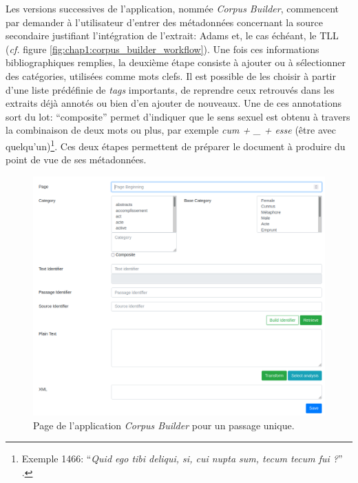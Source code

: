 Les versions successives de l'application, nommée \textit{Corpus Builder}, commencent par demander à l'utilisateur d'entrer des métadonnées concernant la source secondaire justifiant l'intégration de l'extrait: Adams et, le cas échéant, le TLL (\textit{cf.} figure \ref{fig:chap1:corpus_builder_workflow}). Une fois ces informations bibliographiques remplies, la deuxième étape consiste à ajouter ou à sélectionner des catégories, utilisées comme mots clefs. Il est possible de les choisir à partir d'une liste prédéfinie de \textit{tags} importants, de reprendre ceux retrouvés dans les extraits déjà annotés ou bien d'en ajouter de nouveaux. Une de ces annotations sort du lot: \enquote{composite} permet d'indiquer que le sens sexuel est obtenu à travers la combinaison de deux mots ou plus, par exemple \textit{cum + \_ + esse} (être avec quelqu'un)\footnote{Exemple 1466: \enquote{\textit{Quid ego tibi deliqui, si, cui nupta sum, tecum {tecum} fui ?}} \textcite[p.~177]{adams}.}. Ces deux étapes permettent de préparer le document à produire du point de vue de ses métadonnées.

\begin{figure}
    \centering
    \includegraphics[width=\textwidth]{figures/chap1/part3/exemplier/corpus_builder_single.png}
    \caption{Page de l'application \textit{Corpus Builder} pour un passage unique.}
    \label{fig:chap1:corpus_builder_single}
\end{figure}

